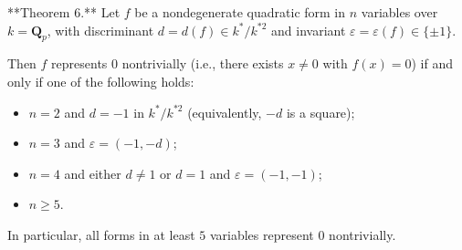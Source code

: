 **Theorem 6.** Let $f$ be a nondegenerate quadratic form in $n$ variables over $k = \mathbf{Q}_p$, with discriminant $d = d(f) \in k^*/k^{*2}$ and invariant $\varepsilon = \varepsilon(f) \in \{\pm 1\}$.

Then $f$ represents $0$ nontrivially (i.e., there exists $x \neq 0$ with $f(x) = 0$) if and only if one of the following holds:

\begin{itemize}
\item[(i)] $n = 2$ and $d = -1$ in $k^*/k^{*2}$ (equivalently, $-d$ is a square);
\item[(ii)] $n = 3$ and $\varepsilon = (-1, -d)$;
\item[(iii)] $n = 4$ and either $d \neq 1$ or $d = 1$ and $\varepsilon = (-1, -1)$;
\item[(iv)] $n \geq 5$.
\end{itemize}

In particular, all forms in at least $5$ variables represent $0$ nontrivially.
